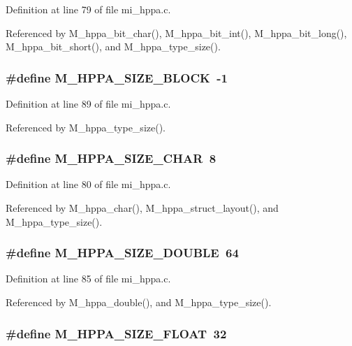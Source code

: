 Definition at line 79 of file mi\_\-hppa.c.

Referenced by M\_\-hppa\_\-bit\_\-char(), M\_\-hppa\_\-bit\_\-int(), M\_\-hppa\_\-bit\_\-long(), M\_\-hppa\_\-bit\_\-short(), and M\_\-hppa\_\-type\_\-size().
\subsubsection{\setlength{\rightskip}{0pt plus 5cm}\#define M\_\-HPPA\_\-SIZE\_\-BLOCK~-1}\label{mi__hppa_8c_c766e2bb31b6fc778964ce0e9bc9025c}




Definition at line 89 of file mi\_\-hppa.c.

Referenced by M\_\-hppa\_\-type\_\-size().
\subsubsection{\setlength{\rightskip}{0pt plus 5cm}\#define M\_\-HPPA\_\-SIZE\_\-CHAR~8}\label{mi__hppa_8c_6a8549bbe303adec13ed65f7f5d644b8}




Definition at line 80 of file mi\_\-hppa.c.

Referenced by M\_\-hppa\_\-char(), M\_\-hppa\_\-struct\_\-layout(), and M\_\-hppa\_\-type\_\-size().
\subsubsection{\setlength{\rightskip}{0pt plus 5cm}\#define M\_\-HPPA\_\-SIZE\_\-DOUBLE~64}\label{mi__hppa_8c_3dee4e7e50b8153505cb8610a61327cc}




Definition at line 85 of file mi\_\-hppa.c.

Referenced by M\_\-hppa\_\-double(), and M\_\-hppa\_\-type\_\-size().
\subsubsection{\setlength{\rightskip}{0pt plus 5cm}\#define M\_\-HPPA\_\-SIZE\_\-FLOAT~32}\label{mi__hppa_8c_d929613f890d6c9cc488c20f7853f9d7}





